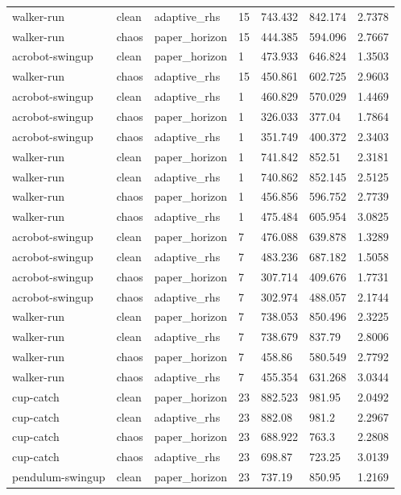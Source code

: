 \begin{tabular}{lllllll}
walker-run & clean & adaptive\_rhs & 15 & 743.432 & 842.174 & 2.7378 \\
walker-run & chaos & paper\_horizon & 15 & 444.385 & 594.096 & 2.7667 \\
acrobot-swingup & clean & paper\_horizon & 1 & 473.933 & 646.824 & 1.3503 \\
walker-run & chaos & adaptive\_rhs & 15 & 450.861 & 602.725 & 2.9603 \\
acrobot-swingup & clean & adaptive\_rhs & 1 & 460.829 & 570.029 & 1.4469 \\
acrobot-swingup & chaos & paper\_horizon & 1 & 326.033 & 377.04 & 1.7864 \\
acrobot-swingup & chaos & adaptive\_rhs & 1 & 351.749 & 400.372 & 2.3403 \\
walker-run & clean & paper\_horizon & 1 & 741.842 & 852.51 & 2.3181 \\
walker-run & clean & adaptive\_rhs & 1 & 740.862 & 852.145 & 2.5125 \\
walker-run & chaos & paper\_horizon & 1 & 456.856 & 596.752 & 2.7739 \\
walker-run & chaos & adaptive\_rhs & 1 & 475.484 & 605.954 & 3.0825 \\
acrobot-swingup & clean & paper\_horizon & 7 & 476.088 & 639.878 & 1.3289 \\
acrobot-swingup & clean & adaptive\_rhs & 7 & 483.236 & 687.182 & 1.5058 \\
acrobot-swingup & chaos & paper\_horizon & 7 & 307.714 & 409.676 & 1.7731 \\
acrobot-swingup & chaos & adaptive\_rhs & 7 & 302.974 & 488.057 & 2.1744 \\
walker-run & clean & paper\_horizon & 7 & 738.053 & 850.496 & 2.3225 \\
walker-run & clean & adaptive\_rhs & 7 & 738.679 & 837.79 & 2.8006 \\
walker-run & chaos & paper\_horizon & 7 & 458.86 & 580.549 & 2.7792 \\
walker-run & chaos & adaptive\_rhs & 7 & 455.354 & 631.268 & 3.0344 \\
cup-catch & clean & paper\_horizon & 23 & 882.523 & 981.95 & 2.0492 \\
cup-catch & clean & adaptive\_rhs & 23 & 882.08 & 981.2 & 2.2967 \\
cup-catch & chaos & paper\_horizon & 23 & 688.922 & 763.3 & 2.2808 \\
cup-catch & chaos & adaptive\_rhs & 23 & 698.87 & 723.25 & 3.0139 \\
pendulum-swingup & clean & paper\_horizon & 23 & 737.19 & 850.95 & 1.2169 \\

\end{tabular}
